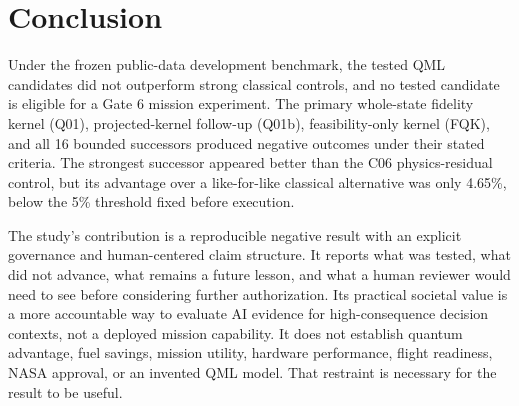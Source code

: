 \section{Conclusion}

Under the frozen public-data development benchmark, the tested QML candidates
did not outperform strong classical controls, and no tested candidate is
eligible for a Gate 6 mission experiment. The primary whole-state fidelity
kernel (Q01), projected-kernel follow-up (Q01b), feasibility-only kernel (FQK),
and all 16 bounded successors produced negative outcomes under their stated
criteria. The strongest successor appeared better than the C06 physics-residual
control, but its advantage over a like-for-like classical alternative was only
4.65\%, below the 5\% threshold fixed before execution.

The study's contribution is a reproducible negative result with an explicit
governance and human-centered claim structure. It reports what was tested, what
did not advance, what remains a future lesson, and what a human reviewer would
need to see before considering further authorization. Its practical societal
value is a more accountable way to evaluate AI evidence for high-consequence
decision contexts, not a deployed mission capability. It does not establish
quantum advantage, fuel savings, mission utility, hardware performance, flight
readiness, NASA approval, or an invented QML model. That restraint is necessary
for the result to be useful.

